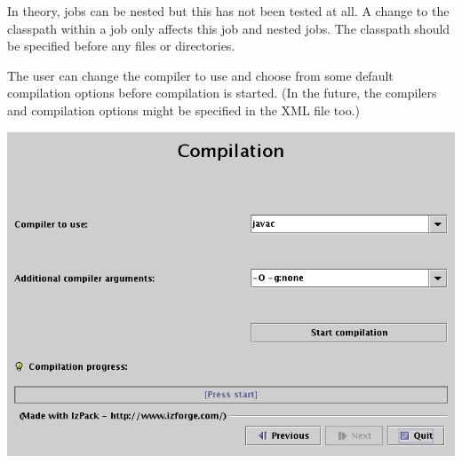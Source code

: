In theory, jobs can be nested but this has not been tested at all. A change to
the classpath within a job only affects this job and nested jobs. The classpath
should be specified before any files or directories.

The user can change the compiler to use and choose from some default
compilation options before compilation is started. (In the future, the
compilers and compilation options might be specified in the XML file too.)

\includegraphics[width=\linewidth]{img/compilePanel}

